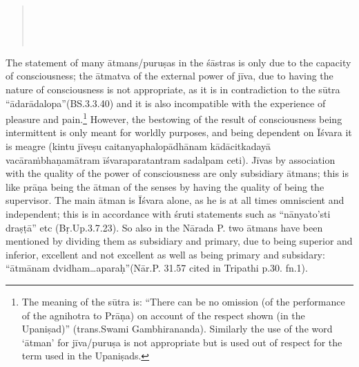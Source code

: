 \begin{verse}
\\
\\
\\
\end{verse}

The statement of many ātmans/puruṣas in the śāstras is only due to the capacity of consciousness; the ātmatva of the external power of  jīva, due to having the nature of consciousness is not appropriate, as it is in contradiction to the sūtra “ādarādalopa”(BS.3.3.40) and it is also incompatible with the experience of pleasure and pain.\footnote{The meaning of the sūtra is: “There can be no omission (of the performance of the agnihotra to Prāṇa) on account of the respect shown (in the Upaniṣad)” (trans.Swami Gambhirananda). Similarly the use of the word ‘ātman’ for jīva/puruṣa is not appropriate but is used out of respect for the term used in the Upaniṣads.} However, the bestowing of the result of consciousness being intermittent is only meant for worldly purposes, and being dependent on Īśvara it is meagre (kintu jīveṣu caitanyaphalopādhānam kādācitkadayā vacāraṁbhaṇamātram īśvaraparatantram sadalpam ceti). Jīvas by association with the quality of the power of consciousness are only subsidiary ātmans; this is like prāṇa being the ātman of the senses by having the quality of being the supervisor. The main ātman is Īśvara alone, as he is at all times omniscient and independent; this is in accordance with śruti statements such as “nānyato’sti draṣṭā” etc (Bṛ.Up.3.7.23). So also in the Nārada P. two ātmans have been mentioned by dividing them as subsidiary and primary, due to being superior and inferior, excellent and not excellent as well as being primary and subsidary: “ātmānam dvidham…aparaḥ”(Nār.P. 31.57 cited in Tripathi p.30. fn.1). 

